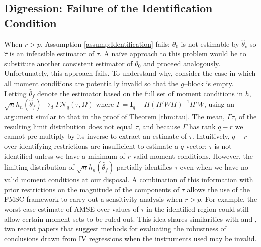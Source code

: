 \documentclass[12pt]{article}
\theoremstyle{definition}
\begin{document}
\subsection{Digression: Failure of the Identification Condition}
\label{subsec:digress}
When $r > p$, Assumption \ref{assump:Identification} fails: $\theta_0$ is not estimable by $\widehat{\theta}_v$ so $\widehat{\tau}$ is an infeasible estimator of $\tau$. 
A na\"{i}ve approach to this problem would be to substitute another consistent estimator of $\theta_0$ and proceed analogously. 
Unfortunately, this approach fails. To understand why, consider the case in which all moment conditions are potentially invalid so that the $g$--block is empty. 
Letting $\widehat{\theta}_f$ denote the estimator based on the full set of moment conditions in $h$,  $\sqrt{n}h_n(\widehat{\theta}_f) \rightarrow_d\Gamma  \mathcal{N}_q(\tau, \Omega)$ where $\Gamma = \mathbf{I}_q - H \left(H'WH\right)^{-1}H'W$, using an argument similar to that in the proof of Theorem \ref{thm:tau}. 
The mean, $\Gamma \tau$, of the resulting limit distribution does not equal $\tau$, and because $\Gamma$ has rank $q-r$ we cannot pre-multiply by its inverse to extract an estimate of $\tau$.
Intuitively, $q-r$ over-identifying restrictions are insufficient to estimate a $q$-vector: $\tau$ is not identified unless we have a minimum of $r$ valid moment conditions. 
However, the limiting distribution of $\sqrt{n}h_n(\widehat{\theta}_f)$ partially identifies $\tau$ even when we have no valid moment conditions at our disposal. 
A combination of this information with prior restrictions on the magnitude of the components of $\tau$ allows the use of the FMSC framework to carry out a sensitivity analysis when $r>p$. 
For example, the worst-case estimate of AMSE over values of $\tau$ in the identified region could still allow certain moment sets to be ruled out.
This idea shares similarities with \citet{Kraay} and \citet{Conleyetal}, two recent papers that suggest methods for evaluating the robustness of conclusions drawn from IV regressions when the instruments used may be invalid.
\end{document}
